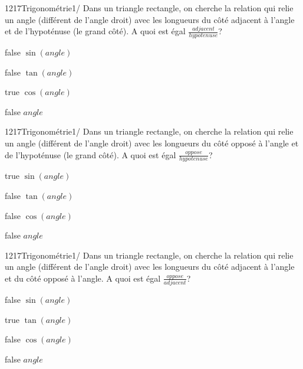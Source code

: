         	\begin{question}{1217}{Trigonométrie}{1}{/}
				Dans un triangle rectangle, on cherche la relation qui relie un angle (différent de l'angle droit) avec les longueurs du côté adjacent à l'angle et de l'hypoténuse (le grand côté). A quoi est égal $\frac{adjacent}{hypotenuse}$?
            \end{question}
            \begin{reponses}
            	\item[false] $\sin(angle)$
            	\item[false] $\tan(angle)$
                \item[true] $\cos(angle)$
                \item[false] $angle$
            \end{reponses}
        	\begin{question}{1217}{Trigonométrie}{1}{/}
				Dans un triangle rectangle, on cherche la relation qui relie un angle (différent de l'angle droit) avec les longueurs du côté opposé à l'angle et de l'hypoténuse (le grand côté). A quoi est égal $\frac{oppose}{hypotenuse}$?
            \end{question}
            \begin{reponses}
            	\item[true] $\sin(angle)$
            	\item[false] $\tan(angle)$
                \item[false] $\cos(angle)$
                \item[false] $angle$
            \end{reponses}
        	\begin{question}{1217}{Trigonométrie}{1}{/}
				Dans un triangle rectangle, on cherche la relation qui relie un angle (différent de l'angle droit) avec les longueurs du côté adjacent à l'angle et du côté opposé à l'angle. A quoi est égal $\frac{oppose}{adjacent}$?
            \end{question}
            \begin{reponses}
            	\item[false] $\sin(angle)$
                \item[true] $\tan(angle)$
                \item[false] $\cos(angle)$
            	\item[false] $angle$
            \end{reponses}
